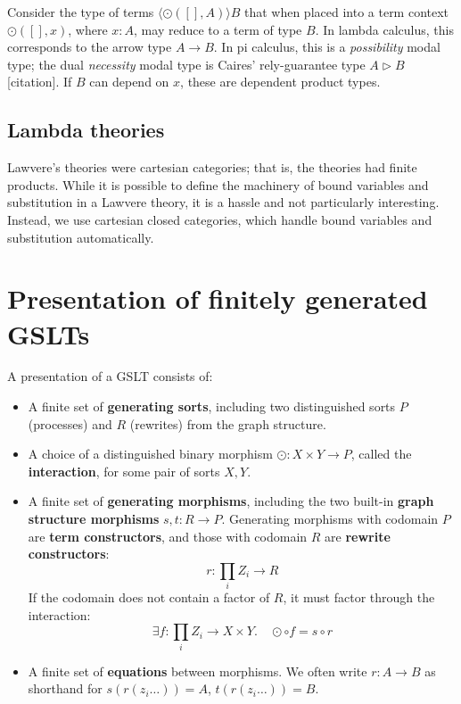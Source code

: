 \documentclass{article}
\begin{document}
Consider the type of terms $\langle \odot([], A) \rangle B$ that when placed into a term context $\odot([], x)$, where $x : A$, may reduce to a term of type $B$. In lambda calculus, this corresponds to the arrow type $A \to B$. In pi calculus, this is a \emph{possibility} modal type; the dual \emph{necessity} modal type is Caires' rely-guarantee type $A \triangleright B$ [citation]. If $B$ can depend on $x$, these are dependent product types.

\subsection{Lambda theories}

Lawvere's theories were cartesian categories; that is, the theories had finite products. While it is possible to define the machinery of bound variables and substitution in a Lawvere theory, it is a hassle and not particularly interesting. Instead, we use cartesian closed categories, which handle bound variables and substitution automatically.

\section{Presentation of finitely generated GSLTs}

A presentation of a GSLT consists of:

\begin{itemize}
    \item A finite set of \textbf{generating sorts}, including two distinguished sorts $P$ (processes) and $R$ (rewrites) from the graph structure.
    \item A choice of a distinguished binary morphism $\odot : X \times Y \to P$, called the \textbf{interaction}, for some pair of sorts $X, Y$.
    \item A finite set of \textbf{generating morphisms}, including the two built-in \textbf{graph structure morphisms} $s, t : R \to P$. Generating morphisms with codomain $P$ are \textbf{term constructors}, and those with codomain $R$ are \textbf{rewrite constructors}:
    \[
    r : \prod_i Z_i \to R
    \]
    If the codomain does not contain a factor of $R$, it must factor through the interaction:
    \[
    \exists f : \prod_i Z_i \to X \times Y. \quad \odot \circ f = s \circ r
    \]
    \item A finite set of \textbf{equations} between morphisms. We often write $r : A \to B$ as shorthand for $s(r(z_i \ldots)) = A$, $t(r(z_i \ldots)) = B$.
\end{itemize}
\end{document}
